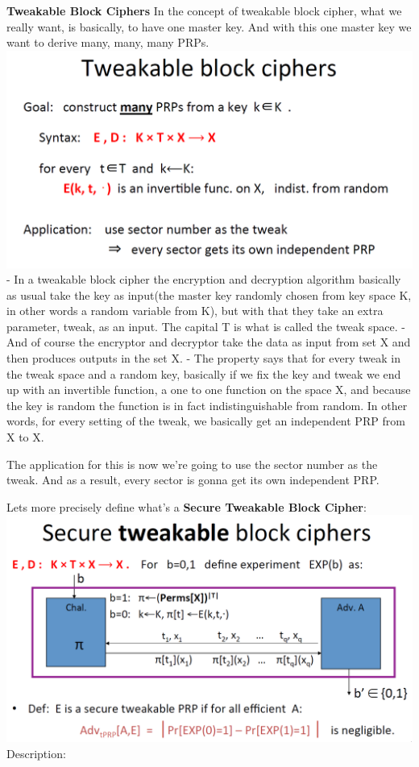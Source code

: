 \documentclass[11pt]{article}
\makeatletter
\def\maxwidth{\ifdim\Gin@nat@width>\linewidth\linewidth
    \else\Gin@nat@width\fi}
\let\Oldincludegraphics\includegraphics
\renewcommand{\includegraphics}[1]{\Oldincludegraphics[width=.8\maxwidth]{#1}}
\makeatother
\begin{document}
\textbf{Tweakable Block Ciphers} In the concept of tweakable block
cipher, what we really want, is basically, to have one master key. And
with this one master key we want to derive many, many, many PRPs.
\includegraphics{./Images/TweakableBlockCiphers.png} - In a tweakable
block cipher the encryption and decryption algorithm basically as usual
take the key as input(the master key randomly chosen from key space K,
in other words a random variable from K), but with that they take an
extra parameter, tweak, as an input. The capital T is what is called the
tweak space. - And of course the encryptor and decryptor take the data
as input from set X and then produces outputs in the set X. - The
property says that for every tweak in the tweak space and a random key,
basically if we fix the key and tweak we end up with an invertible
function, a one to one function on the space X, and because the key is
random the function is in fact indistinguishable from random. In other
words, for every setting of the tweak, we basically get an independent
PRP from X to X.

The application for this is now we're going to use the sector number as
the tweak. And as a result, every sector is gonna get its own
independent PRP.

Lets more precisely define what's a \textbf{Secure Tweakable Block
Cipher}: \includegraphics{./Images/SecureTweakableBlockCipher.png}
Description:
\end{document}

